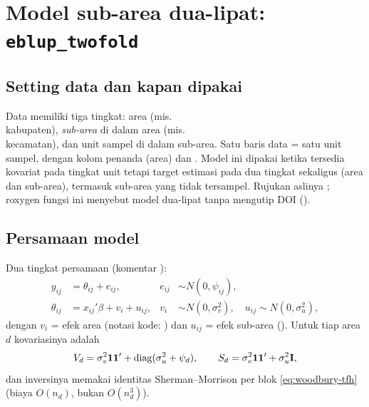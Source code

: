 \section{Model sub-area dua-lipat: \texttt{eblup\_twofold}}\label{sec:twofold}

\subsection{Setting data dan kapan dipakai}\label{sec:twofold-setting}

Data memiliki tiga tingkat: area (mis.\\ kabupaten), \emph{sub-area} di dalam
area (mis.\\ kecamatan), dan unit sampel di dalam sub-area. Satu baris data =
satu unit sampel, dengan kolom penanda  (area) dan
. Model ini dipakai ketika tersedia kovariat pada tingkat unit
tetapi target estimasi pada dua tingkat sekaligus (area dan sub-area),
termasuk sub-area yang tidak tersampel. Rujukan aslinya
\citet{torabi2014small}; roxygen fungsi ini menyebut model dua-lipat tanpa
mengutip DOI ().

\subsection{Persamaan model}\label{sec:twofold-model}

Dua tingkat persamaan (komentar ):
\begin{align}
  y_{ij} &= \theta_{ij}+e_{ij}, & e_{ij}&\sim N(0,\psi_{ij}),
    \label{eq:tf-lvl1}\\
  \theta_{ij} &= x_{ij}'\beta+v_i+u_{ij}, &
    v_i&\sim N(0,\sigma_v^2),\quad u_{ij}\sim N(0,\sigma_u^2),
    \label{eq:tf-lvl2}
\end{align}
dengan $v_i$ = efek area (notasi kode: ) dan $u_{ij}$ = efek
sub-area (). Untuk tiap area $d$ kovariasinya adalah
\begin{equation}
  V_d=\sigma_v^2\mathbf{1}\mathbf{1}'
  +\mathrm{diag}(\sigma_u^2+\psi_d),
  \qquad
  S_d=\sigma_v^2\mathbf{1}\mathbf{1}'+\sigma_u^2\mathbf{I},
  \label{eq:tf-block}
\end{equation}
dan inversinya memakai identitas Sherman--Morrison per blok
\eqref{eq:woodbury-tfh} (biaya $O(n_d)$, bukan $O(n_d^3)$).


